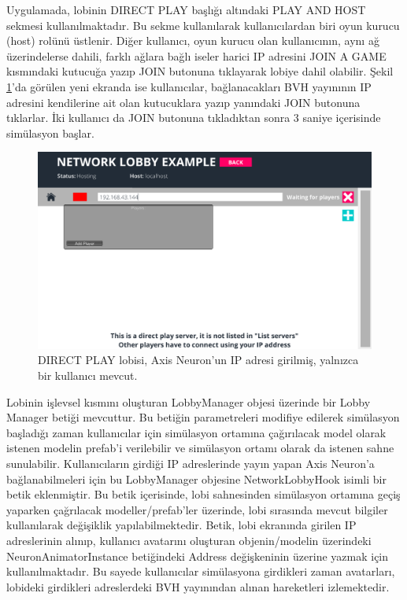 \documentclass[a4paper, 12pt, titlepage]{article}
\begin{document}
Uygulamada, lobinin DIRECT PLAY başlığı altındaki PLAY AND HOST sekmesi kullanılmaktadır. Bu sekme
kullanılarak kullanıcılardan biri oyun kurucu (host) rolünü üstlenir. Diğer kullanıcı, oyun kurucu
olan kullanıcının, aynı ağ üzerindelerse dahili, farklı ağlara bağlı iseler harici IP adresini JOIN
A GAME kısmındaki kutucuğa yazıp JOIN butonuna tıklayarak lobiye dahil olabilir. Şekil \ref{l1}’da
görülen yeni ekranda ise kullanıcılar, bağlanacakları BVH yayınının IP adresini
kendilerine ait olan kutucuklara yazıp yanındaki JOIN butonuna tıklarlar. İki kullanıcı da JOIN
butonuna tıkladıktan sonra 3 saniye içerisinde simülasyon başlar.

\begin{figure}[ht!]
    \centering
        \includegraphics[width=6in]{images/l1}
    \caption{DIRECT PLAY lobisi, Axis Neuron'un IP adresi girilmiş, yalnızca bir kullanıcı mevcut.}
    \label{l1}
\end{figure}

Lobinin işlevsel kısmını oluşturan LobbyManager objesi üzerinde bir Lobby Manager betiği mevcuttur.
Bu betiğin parametreleri modifiye edilerek simülasyon başladığı zaman kullanıcılar için simülasyon
ortamına çağırılacak model olarak istenen modelin prefab’i verilebilir ve simülasyon ortamı olarak
da istenen sahne sunulabilir. Kullanıcıların girdiği IP adreslerinde yayın yapan Axis Neuron’a
bağlanabilmeleri için bu LobbyManager objesine NetworkLobbyHook isimli bir betik eklenmiştir. Bu
betik içerisinde, lobi sahnesinden simülasyon ortamına geçiş yaparken çağrılacak modeller/prefab’ler
üzerinde, lobi sırasında mevcut bilgiler kullanılarak değişiklik yapılabilmektedir. Betik, lobi
ekranında girilen IP adreslerinin alınıp, kullanıcı avatarını oluşturan objenin/modelin üzerindeki
NeuronAnimatorInstance betiğindeki Address değişkeninin üzerine yazmak için kullanılmaktadır. Bu
sayede kullanıcılar simülasyona girdikleri zaman avatarları, lobideki girdikleri adreslerdeki BVH
yayınından alınan hareketleri izlemektedir.
\end{document}
